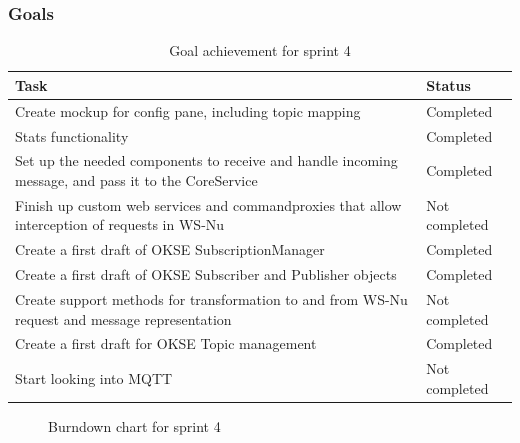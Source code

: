 \subsubsection{Goals}
\label{subsec:project_lifecycle-development-sprint_4-goals}

\begin{table}[ht!]
\small
\centering
\begin{tabular}{ | p{10cm} | p{2cm} |}
\hline
 \rowcolor{lightgray}
 \textbf{Task} & \textbf{Status} \\
\hline
\rowcolor{green!30}
Create mockup for config pane, including topic mapping & Completed \\
\rowcolor{green!30}
Stats functionality	& Completed \\
\rowcolor{green!30}
Set up the needed components to receive and handle incoming message, and pass it to the CoreService	& Completed \\
\rowcolor{orange!40}
Finish up custom web services and commandproxies that allow interception of requests in WS-Nu	& Not completed \\
\rowcolor{green!30}
Create a first draft of OKSE SubscriptionManager & Completed \\
\rowcolor{green!30}
Create a first draft of OKSE Subscriber and Publisher objects & Completed \\
\rowcolor{orange!40}
Create support methods for transformation to and from WS-Nu request and message representation	& Not completed \\
\rowcolor{green!30}
Create a first draft for OKSE Topic management & Completed \\
\rowcolor{orange!40}
Start looking into MQTT	& Not completed \\
\hline
\end{tabular}
\caption{Goal achievement for sprint 4}
\label{tab:sprint 4, goals}
\end{table}

\begin{center}
  \begin{figure}[ht!]
    \caption{Burndown chart for sprint 4}
    \label{fig:sprint 4, burndown}
  \end{figure}
\end{center}

